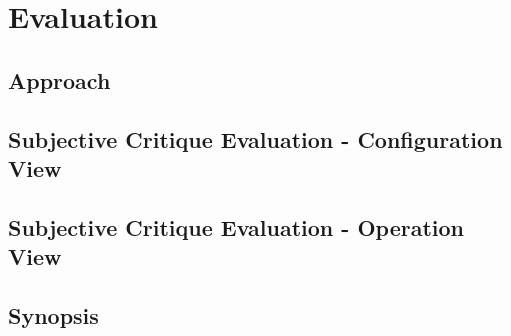 \chapter{Evaluation}
\label{chap:evaluation}

\section{Approach}
\label{sec:evaluation:approach}

\section{Subjective Critique Evaluation - Configuration View}
\label{sec:evaluation:configuration}

\section{Subjective Critique Evaluation - Operation View}
\label{sec:evaluation:operation}

\section{Synopsis}
\label{sec:evaluation:synopsis}
